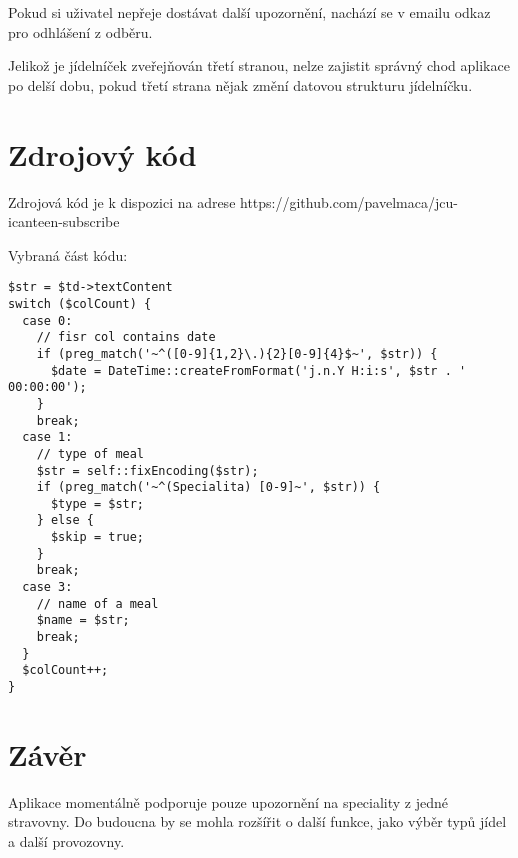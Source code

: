 \documentclass[a4]{article}
\begin{document}
Pokud si uživatel nepřeje dostávat další upozornění, nachází se v emailu odkaz pro odhlášení z odběru.

Jelikož je jídelníček zveřejňován třetí stranou, nelze zajistit správný chod aplikace po delší dobu, pokud třetí strana nějak změní datovou strukturu jídelníčku.

\section{Zdrojový kód}
Zdrojová kód je k dispozici na adrese https://github.com/pavelmaca/jcu-icanteen-subscribe

Vybraná část kódu:
\lstset{language=PHP}
\begin{lstlisting}
$str = $td->textContent
switch ($colCount) {
  case 0:
    // fisr col contains date
    if (preg_match('~^([0-9]{1,2}\.){2}[0-9]{4}$~', $str)) {
      $date = DateTime::createFromFormat('j.n.Y H:i:s', $str . ' 00:00:00');
    }
    break;
  case 1:
    // type of meal
    $str = self::fixEncoding($str);
    if (preg_match('~^(Specialita) [0-9]~', $str)) {
      $type = $str;
    } else {
      $skip = true;
    }
    break;
  case 3:
    // name of a meal
    $name = $str;
    break;
  }
  $colCount++;
}
\end{lstlisting}

\section{Závěr}
Aplikace momentálně podporuje pouze upozornění na speciality z jedné stravovny. Do budoucna by se mohla rozšířit o další funkce, jako výběr typů jídel a další provozovny.
\end{document}
